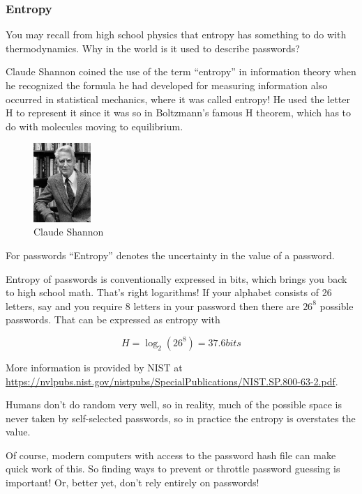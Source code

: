 \subsubsection{Entropy}

You may recall from high school physics that entropy has something to do with thermodynamics.  Why in the world is it used to describe passwords?  

Claude Shannon coined the use of the term “entropy” in information theory when he recognized the formula he had developed for measuring information also occurred in statistical mechanics, where it was called entropy!  He used the letter H to represent it since it was so in Boltzmann’s famous H theorem, which has to do with molecules moving to equilibrium.
\begin{figure}[h]
\centering
\includegraphics[height=3cm]{Claude_Shannon.jpeg}
\caption{Claude Shannon}
\end{figure}

For passwords “Entropy” denotes the uncertainty in the value of a password. 

Entropy of passwords is conventionally expressed in bits, which brings you back to high school math.  That’s right logarithms!  If your alphabet consists of 26 letters, say and you require 8 letters in your password then there are \(26^8\) possible passwords. That can be expressed as entropy with

\[H = \log_2(26^8) = 37.6 bits\]

More information is provided by NIST at \url{https://nvlpubs.nist.gov/nistpubs/SpecialPublications/NIST.SP.800-63-2.pdf}.

Humans don’t do random very well, so in reality, much of the possible space is never taken by self-selected passwords, so in practice the entropy is overstates the value.

Of course, modern computers with access to the password hash file can make quick work of this.  So finding ways to prevent or throttle password guessing is important!  Or, better yet, don’t rely entirely on passwords!
